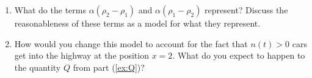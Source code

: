 \begin{enumerate}
\begin{enumerate}
		
		\item What do the terms $\alpha (\rho_2-\rho_1)$ and $\alpha(\rho_1 - \rho_2)$ represent? Discuss the reasonableness of these terms as a model for what they represent.
		
		
		\item How would you change this model to account for the fact that $n(t)>0$ cars get into the highway at the position $x=2$. What do you expect to happen to the quantity $Q$ from part (\ref{ex:Q})?
		
	\end{enumerate}

	
		
	
\end{enumerate}
















